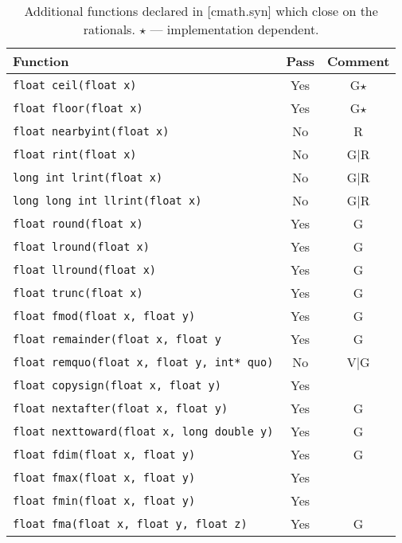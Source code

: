 \documentclass[prd,twocolumn,amsmath,amssymb,nofootinbib,eqsecnum]{revtex4-1}
\newcommand{\code}[1]{{\tt #1}}
\begin{document}
\begin{table}[h]
	\begin{tabular}{lcc}
		Function & Pass & Comment
	\\
	\hline \hline
		\code{float ceil(float x)} &  Yes & G$\star$
	\\
	\hline
		\code{float floor(float x)} & Yes & G$\star$
	\\
	\hline
		\code{float nearbyint(float x)} & No & R
	\\
	\hline
		\code{float rint(float x)} & No & G$\vert$R
	\\
	\hline
		\code{long int lrint(float x)} &  No & G$\vert$R
	\\
	\hline
		\code{long long int llrint(float x)} & No & G$\vert$R
	\\
	\hline
		\code{float round(float x)} & Yes & G
	\\
	\hline
		\code{float lround(float x)} & Yes & G
	\\
	\hline
		\code{float llround(float x)} & Yes & G
	\\
	\hline
		\code{float trunc(float x)} &  Yes & G
	\\
	\hline
		\code{float fmod(float x, float y)} & Yes & G
	\\
	\hline
		\code{float remainder(float x, float y} & Yes & G
	\\
	\hline
		\code{float remquo(float x, float y, int* quo)} & No & V$\vert$G
	\\
	\hline
		\code{float copysign(float x, float y)} & Yes &
	\\
	\hline
		\code{float nextafter(float x, float y)} & Yes & G
	\\
	\hline
		\code{float nexttoward(float x, long double y)} & Yes & G
	\\
	\hline
		\code{float fdim(float x, float y)} & Yes & G
	\\
	\hline
		\code{float fmax(float x, float y)} & Yes &
	\\
	\hline
		\code{float fmin(float x, float y)} & Yes &
	\\
	\hline
		\code{float fma(float x, float y, float z)} & Yes & G
	\end{tabular}
\caption{Additional functions declared in [cmath.syn]  which close on the rationals. $\star$ --- implementation dependent.}
\label{tab:26.9.3}
\end{table}
\end{document}
